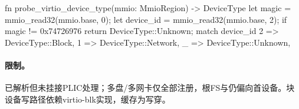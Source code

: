 \begin{rustcode}
fn probe_virtio_device_type(mmio: MmioRegion) -> DeviceType {
    let magic = mmio_read32(mmio.base, 0);
    let device_id = mmio_read32(mmio.base, 2);
    if magic != 0x74726976 {
        return DeviceType::Unknown;
    }
    match device_id {
        2 => DeviceType::Block,
        1 => DeviceType::Network,
        _ => DeviceType::Unknown,
    }
}
\end{rustcode}

\paragraph{限制。}已解析但未挂接PLIC处理；多盘/多网卡仅全部注册，根FS与仍偏向首设备。块设备写路径依赖virtio-blk实现，缓存为写穿。
